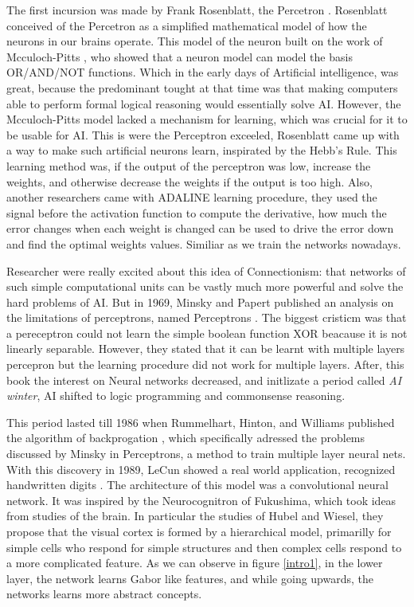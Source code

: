 \documentclass[12pt, a4paper, titlepage,twoside,openright]{article}
\begin{document}
The first incursion was made by Frank Rosenblatt, the Percetron \cite{rosenblat}. Rosenblatt conceived of the Percetron as a simplified mathematical model of how the neurons in our brains operate. This model of the neuron built on the work of Mcculoch-Pitts \cite{McCulloch}, who showed that a neuron model can model the basis OR/AND/NOT functions. Which in the early days of Artificial intelligence, was great, because the predominant tought at that time was that making computers able to perform formal logical reasoning would essentially solve AI. However, the Mcculoch-Pitts model lacked a mechanism for learning, which was crucial for it to be usable for AI. This is were the Perceptron exceeled, Rosenblatt came up with a way to make such artificial neurons learn, inspirated by the Hebb's Rule. This learning method was, if the output of the perceptron was low, increase the weights, and otherwise decrease the weights if the output is too high. Also, another researchers came with ADALINE \cite{adaline} learning procedure, they used the signal before the activation function to compute the derivative, how much the error changes when each weight is changed can be used to drive the error down and find the optimal weights values. Similiar as we train the networks nowadays.

Researcher were really excited about this idea of Connectionism: that networks of such simple computational units can be vastly much more powerful and solve the hard problems of AI. But in 1969, Minsky and Papert  published an analysis on the limitations of perceptrons, named Perceptrons \cite{minsky69perceptrons}. The biggest cristicm was that a pereceptron could not learn the simple boolean function XOR beacause it is not linearly separable. However, they stated that it can be learnt with multiple layers percepron but the learning procedure did not work for multiple layers. After, this book the interest on Neural networks decreased, and initlizate a period called \textit{AI winter}, AI shifted to logic programming and commonsense reasoning.

This period lasted till 1986 when Rummelhart, Hinton, and Williams published the algorithm of backprogation \cite{Rumelhart}, which specifically adressed the problems discussed by Minsky in Perceptrons, a method to train multiple layer neural nets. With this discovery in 1989, LeCun showed a real world application, recognized handwritten digits \cite{lecunZip}. The architecture of this model was a convolutional neural network. It was inspired by the Neurocognitron \cite{Fukushima} of Fukushima, which took ideas from studies of the brain. In particular the studies of Hubel and Wiesel, they propose that the visual cortex is formed by a hierarchical model, primarilly for simple cells who respond for simple structures and then complex cells respond to a more complicated feature. As we can observe in figure \ref{intro1}, in the lower layer, the network learns Gabor like features, and while going upwards, the networks learns more abstract concepts.
\end{document}
